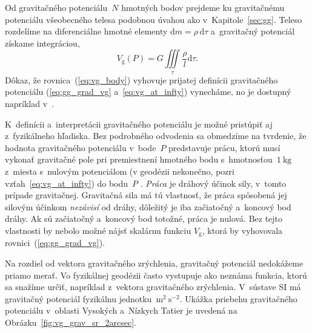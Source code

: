 \documentclass[a4paper,12pt]{book}
\newcommand{\diff}{\mathrm d}
\newcommand{\gidx}{\mathrm g}
\begin{document}
Od gravitačného potenciálu~$N$ hmotných bodov prejdeme ku
gravitačnému potenciálu všeobecného telesa podobnou úvahou ako
v~Kapitole~\ref{sec:gg}.  Teleso rozdelíme na diferenciálne hmotné elementy
$\diff m = \rho \, \diff \tau$ a~gravitačný potenciál získame integráciou,
%
\begin{equation}
\label{eq:vg_body}
V_\gidx(P) = G \iiint\limits_{\tau} \frac{\rho}{l} \diff\tau{.}
\end{equation}
%
Dôkaz, že rovnica~(\ref{eq:vg_body}) vyhovuje prijatej definícii gravitačného
potenciálu (\ref{eq:gg_grad_vg} a~\ref{eq:vg_at_infty}) vynecháme, no je
dostupný napríklad v~\textcite{MacMillan1930}.

K~definícii a~interpretácii gravitačného potenciálu je možné pristúpiť aj 
z~fyzikálneho hľadiska.  Bez podrobného odvodenia sa obmedzíme na tvrdenie, že 
hodnota gravitačného potenciálu v~bode~$P$ predstavuje prácu, ktorú musí 
vykonať gravitačné pole pri premiestnení hmotného bodu s~hmotnosťou~$1\ 
\mathrm{kg}$ z~miesta s~nulovým potenciálom (v geodézii nekonečno, pozri 
vzťah~\ref{eq:vg_at_infty}) do bodu~$P$ 
\parencite{MacMillan1930,Kellogg1967,TorgeGeodesy}.  \emph{Práca} je dráhový 
účinok sily, v~tomto prípade gravitačnej.  Gravitačná sila má tú vlastnosť, že 
práca spôsobená jej silovým účinkom \emph{nezávisí} od dráhy, dôležitý je iba 
začiatočný a~koncový bod dráhy.  Ak sú začiatočný a~koncový bod totožné, práca 
je nulová.  Bez tejto vlastnosti by nebolo možné nájsť skalárnu funkciu 
$V_\gidx$, ktorá by vyhovovala rovnici~(\ref{eq:gg_grad_vg}).

Na rozdiel od vektora gravitačného zrýchlenia, gravitačný potenciál nedokážeme
priamo merať.  Vo fyzikálnej geodézii často vystupuje ako neznáma funkcia,
ktorú sa snažíme určiť, napríklad z~vektora gravitačného zrýchlenia.  V~sústave
SI má gravitačný potenciál fyzikálnu jednotku~$\mathrm{m}^2\ \mathrm{s}^{-2}$.
Ukážka priebehu gravitačného potenciálu v~oblasti Vysokých a~Nízkych Tatier je
uvedená na Obrázku~\ref{fig:vg_grav_sr_2arcsec}.
\end{document}

